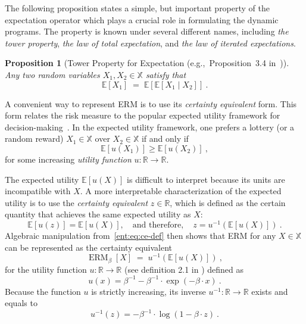 \documentclass[twoside]{article}
\newcommand{\E}{\mathbb{E}}
\renewcommand{\exp}[1]{\operatorname{exp}\left( #1\right) }
\newcommand{\erm}[2]{\operatorname{ERM}_{#1}\left[#2\right]}
\newcommand{\Real}{\mathbb{R}}
\theoremstyle{plain}
\newtheorem{proposition}[theorem]{Proposition}
\theoremstyle{definition}
\theoremstyle{remark}
\renewcommand{\cite}[1]{\citep{#1}}
\begin{document}
The following proposition states a simple, but important property of the expectation operator which plays a crucial role in formulating the dynamic programs. The property is known under several different names, including \emph{the tower property}, \emph{the law of total expectation}, and \emph{the law of iterated expectations}.
\begin{proposition}[Tower Property for Expectation (e.g.,~Proposition~3.4 in~\cite{Ross2007})] \label{ent:lem:tower-exp}
Any two random variables $X_1,X_2\in\mathbb X$ satisfy that
%
\[\E[X_1] \;=\; \E\left[\E[X_1 \mid X_2]\right]~.\]
%
\end{proposition}

A convenient way to represent ERM is to use its \emph{certainty equivalent} form. This form relates the risk measure to the popular expected utility framework for decision-making~\cite{Ben-Tal2007}. In the expected utility framework, one prefers a lottery (or a random reward) $X_1\in \mathbb{X}$ over $X_2 \in \mathbb{X}$ if and only if
\[
 \E[u(X_1)] \ge \E[u(X_2)]~,
\]
for some increasing \emph{utility function} $u\colon \Real \to  \Real$.

The expected utility $\E[u(X)]$ is difficult to interpret because its units are incompatible with $X$. A more interpretable characterization of the expected utility is to use the \emph{certainty equivalent} $z\in \Real$, which is defined as the certain quantity that achieves the same expected utility as $X$:
%
\begin{equation}\label{ent:eq:ce-def}
  \E[u(z)] = \E[u(X)], \quad \text{and therefore}, \quad  z=u^{-1}(\E[u(X)])~.
\end{equation}
%
Algebraic manipulation from~\eqref{ent:eq:ce-def} then shows that ERM for any $X\in \mathbb{X}$ can be represented as the certainty equivalent
 \begin{equation}\label{ent:eq:erm-ce}
   \erm{\beta}{X} \;=\; u^{-1}(\E[u(X)])~,
\end{equation}
for the utility function $u\colon \Real \to \Real$ (see definition 2.1 in \cite{Ben-Tal2007}) defined as
\[
  u(x) = \beta^{-1} - \beta^{-1} \cdot \exp {-\beta \cdot x}~.
\]
Because the function $u$ is strictly increasing, its inverse $u^{-1}\colon  \Real \to \Real$ exists and equals to
\[
  u^{-1}(z) = - \beta^{-1} \cdot \log (1- \beta \cdot z)~.
\]
\end{document}
